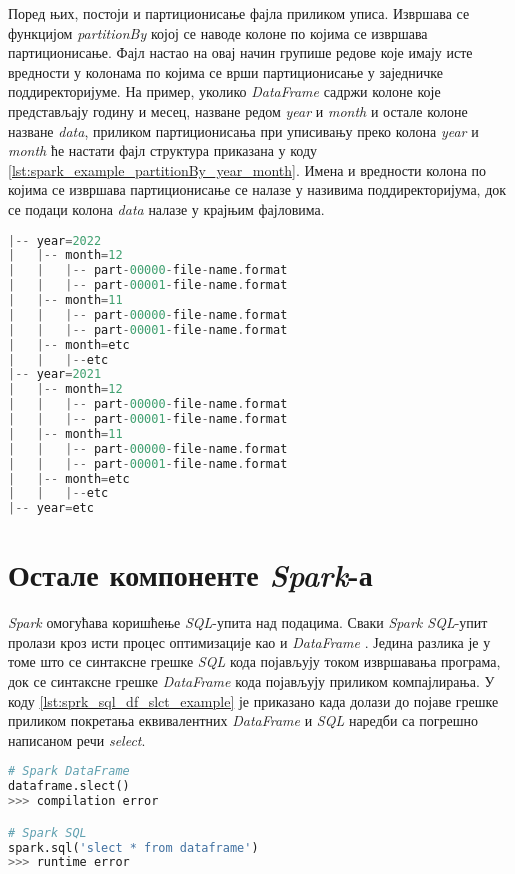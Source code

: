 \documentclass[12pt,oneside]{memoir}
\begin{document}
Поред њих, постоји и партиционисање фајла приликом уписа. Извршава се функцијом \textit{partitionBy} којој се наводе колоне по којима се извршава партиционисање. Фајл настао на овај начин групише редове које имају исте вредности у колонама по којима се врши партиционисање у заједничке поддиректоријуме. На пример, уколико \textit{DataFrame} садржи колоне које представљају годину и месец, назване редом \textit{year} и \textit{month} и остале колоне назване \textit{data}, приликом партиционисања при уписивању преко колона \textit{year} и \textit{month} ће настати фајл структура приказана у коду \ref{lst:spark_example_partitionBy_year_month}. Имена и вредности колона по којима се извршава партиционисање се налазе у називима поддиректоријума, док се подаци колона \textit{data} налазе у крајњим фајловима.

\begin{lstlisting}[caption={Пример структуре излазног директоријума који настаје партиционисањем}, language=Scala, label={lst:spark_example_partitionBy_year_month}]
|-- year=2022
|   |-- month=12
|   |   |-- part-00000-file-name.format
|   |   |-- part-00001-file-name.format
|   |-- month=11
|   |   |-- part-00000-file-name.format
|   |   |-- part-00001-file-name.format
|   |-- month=etc
|   |   |--etc
|-- year=2021
|   |-- month=12
|   |   |-- part-00000-file-name.format
|   |   |-- part-00001-file-name.format
|   |-- month=11
|   |   |-- part-00000-file-name.format
|   |   |-- part-00001-file-name.format
|   |-- month=etc
|   |   |--etc
|-- year=etc
\end{lstlisting}

\section{Остале компоненте \textit{Spark}-а}
\label{sec:spark_components}

\textit{Spark} омогућава коришћење \textit{SQL}-упита над подацима. Сваки \textit{Spark SQL}-упит пролази кроз исти процес оптимизације као и \textit{DataFrame} \cite{spark_guide}. Једина разлика је у томе што се синтаксне грешке \textit{SQL} кода појављују током извршавања програма, док се синтаксне грешке \textit{DataFrame} кода појављују приликом компајлирања. У коду \ref{lst:sprk_sql_df_slct_example} је приказано када долази до појаве грешке приликом покретања еквивалентних \textit{DataFrame} и \textit{SQL} наредби са погрешно написаном речи \textit{select}.  

\begin{lstlisting}[language=Python, caption={Извршавање \textit{DataFrame} и  \textit{SQL} кодова са грешком у писању}, label={lst:sprk_sql_df_slct_example}]
# Spark DataFrame
dataframe.slect()
>>> compilation error

# Spark SQL
spark.sql('slect * from dataframe')
>>> runtime error
\end{lstlisting}
\end{document}
